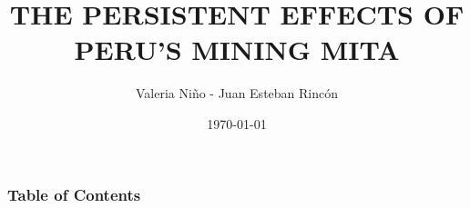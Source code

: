 \documentclass[pdftex,10pt,xcolor=pdftex,table]{beamer}
\title[Peru's Mining Mita]{THE PERSISTENT EFFECTS OF PERU’S MINING MITA}
\author{Valeria Niño - Juan Esteban Rincón}
\institute{PUJ}
\date{\today}
\begin{document}
\frame{\titlepage}

\begin{frame}
\frametitle{Table of Contents}
\tableofcontents
\end{frame}










\end{document}
